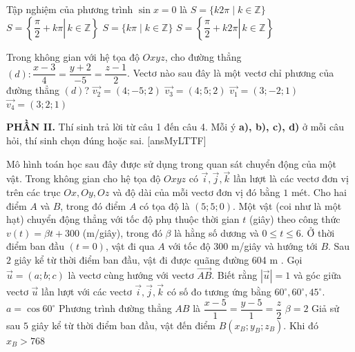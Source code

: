 \documentclass[12pt,a4paper]{article}
\begin{document}
\begin{ex}%
Tập nghiệm của phương trình $\sin x=0$ là
\choice
{$S=\{k2\pi \mid k \in \mathbb{Z}\}$}
{$S=\left\{\left.\dfrac{\pi}{2}+k\pi\right\rvert\, k \in \mathbb{Z}\right\}$}
{$S=\{k\pi \mid k \in \mathbb{Z}\}$}
{$S=\left\{\left.\dfrac{\pi}{2}+k2\pi \right\rvert\, k \in \mathbb{Z}\right\}$}
\end{ex}

\begin{ex}%
Trong không gian với hệ tọa độ $Oxyz$, cho đường thẳng $(d): \dfrac{x-3}{4}=\dfrac{y+2}{-5}=\dfrac{z-1}{2}$. Vectơ nào sau đây là một vectơ chỉ phương của đường thẳng $(d)$?
\choice
{$\overrightarrow{v_2}=(4;-5; 2)$}
{$\overrightarrow{v_3}=(4; 5; 2)$}
{$\overrightarrow{v_1}=(3;-2; 1)$}
{$\overrightarrow{v_4}=(3; 2; 1)$}
\end{ex}

\noindent\textbf{PHẦN II.} Thí sinh trả lời từ câu 1 đến câu 4. Mỗi ý \textbf{a), b), c), d)} ở mỗi câu hỏi, thí sinh chọn đúng hoặc sai.
\setcounter{ex}{0}
[ansMyLTTF]
\begin{ex}%
Mô hình toán học sau đây được sử dụng trong quan sát chuyển động của một vật. Trong không gian cho hệ tọa độ $Oxyz$ có $\vec{i}, \vec{j}, \vec{k}$ lần lượt là các vectơ đơn vị trên các trục $Ox, Oy, Oz$ và độ dài của mỗi vectơ đơn vị đó bằng $1$ mét. Cho hai điểm $A$ và $B$, trong đó điểm $A$ có tọa độ là $(5; 5; 0)$. Một vật (coi như là một hạt) chuyển động thẳng với tốc độ phụ thuộc thời gian $t$ (giây) theo công thức $v(t)=\beta t+300$ (m/giây), trong đó $\beta$ là hằng số dương và $0 \leq t \leq 6$. Ở thời điểm ban đầu $(t=0)$, vật đi qua $A$ với tốc độ $300$ m/giây và hướng tới $B$. Sau $2$ giây kể từ thời điểm ban đầu, vật đi được quãng đường 604 m . Gọi $\vec{u}=(a; b; c)$ là vectơ cùng hướng với vectơ $\overrightarrow{AB}$. Biết rằng $|\vec{u}|=1$ và góc giữa vectơ $\vec{u}$ lần lượt với các vectơ $\vec{i}, \vec{j}, \vec{k}$ có số đo tương ứng bằng $60^{\circ}, 60^{\circ}, 45^{\circ}$.
\choiceTF
{$a=\cos 60^{\circ}$}
{Phương trình đường thẳng $AB$ là $\dfrac{x-5}{1}=\dfrac{y-5}{1}=\dfrac{z}{2}$}
{$\beta=2$}
{Giả sử sau $5$ giây kể từ thời điểm ban đầu, vật đến điểm $B\left(x_B; y_B; z_B\right)$. Khi đó $x_B>768$}
\end{ex}
\end{document}
